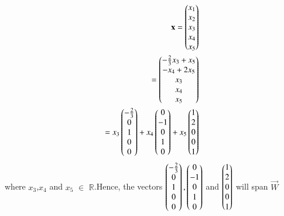 \documentclass[journal,12pt,twocolumn]{IEEEtran}
\begin{document}
   \begin{align}
   \mathbf{x} = \begin{pmatrix}x_1\\x_2\\x_3 \\ x_4 \\ x_5\end{pmatrix} \\= \begin{pmatrix}-\frac{2}{3}x_3+x_5\\-x_4+2x_5\\x_3 \\ x_4 \\ x_5\end{pmatrix}\\=x_3\begin{pmatrix}-\frac{2}{3}\\0\\1\\0\\0\end{pmatrix} +x_4\begin{pmatrix}0\\-1\\0\\1\\0\end{pmatrix}+x_5\begin{pmatrix}1\\2\\0\\0\\1\end{pmatrix}
\end{align}
where $x_3$,$x_4$ and $x_5$ $\in$ $\mathbb{R}$.Hence, the vectors $\begin{pmatrix}-\frac{2}{3}\\0\\1\\0\\0\end{pmatrix},\begin{pmatrix}0\\-1\\0\\1\\0\end{pmatrix}$ and $\begin{pmatrix}1\\2\\0\\0\\1\end{pmatrix}$ will span $\vec{W}$
\end{document}
